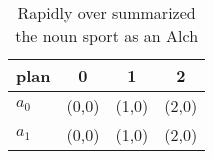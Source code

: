 \documentclass[a4paper]{article}
\begin{document}
\begin{table}
\begin{adjustbox}{width=0.6\columnwidth}
\begin{tabular}{|l|l|l|l|}
\hline
\textbf{plan} & \multicolumn{1}{c|}{\textbf{0}} & \multicolumn{1}{c|}{\textbf{1}} & \multicolumn{1}{c|}{\textbf{2}} \\ \hline
\textbf{$a_0$}  & (0,0) & (1,0) & (2,0) \\ \hline
\textbf{$a_1$}  & (0,0) & (1,0) & (2,0) \\ \hline
\end{tabular}
\end{adjustbox}
\caption{Rapidly over summarized the noun sport as an Alch
}
\end{table}
\end{document}
